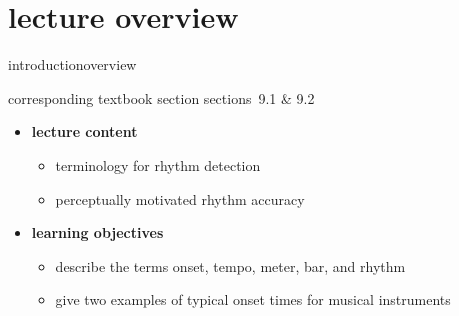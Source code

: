 


\subtitle{module 9.1: introduction to tempo \& rhythm terminology}


	

    \section[overview]{lecture overview}
        \begin{frame}{introduction}{overview}
            \begin{block}{corresponding textbook section}
                    sections~9.1 \& 9.2
            \end{block}

            \begin{itemize}
                \item   \textbf{lecture content}
                    \begin{itemize}
                        \item   terminology for rhythm detection
                        \item   perceptually motivated rhythm accuracy
                    \end{itemize}
                \bigskip
                \item<2->   \textbf{learning objectives}
                    \begin{itemize}
                        \item   describe the terms onset, tempo, meter, bar, and rhythm
                        \item   give two examples of typical onset times for musical instruments
                    \end{itemize}
            \end{itemize}
        \end{frame}


